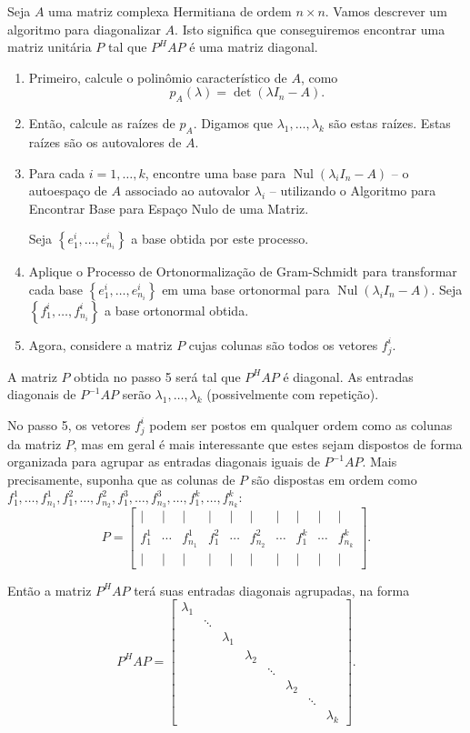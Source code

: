 Seja $A$ uma matriz complexa Hermitiana de ordem $n\times n$. Vamos descrever um algoritmo para diagonalizar $A$. Isto significa que conseguiremos encontrar uma matriz unitária $P$ tal que $P^HAP$ é uma matriz diagonal.

\begin{enumerate}
	\item Primeiro, calcule o polinômio característico de $A$, como
		\[p_A(\lambda)=\det(\lambda I_n-A).\]
	\item Então, calcule as raízes de $p_A$. Digamos que $\lambda_1,\ldots,\lambda_k$ são estas raízes. Estas raízes são os autovalores de $A$.
	\item Para cada $i=1,\ldots,k$, encontre uma base para $\operatorname{Nul}(\lambda_i I_n-A)$ -- o autoespaço de $A$ associado ao autovalor $\lambda_i$ -- utilizando o Algoritmo para Encontrar Base para Espaço Nulo de uma Matriz.
	
	Seja $\left\{e_1^i,\ldots,e_{n_i}^i\right\}$ a base obtida por este processo.
	\item Aplique o Processo de Ortonormalização de Gram-Schmidt para transformar cada base $\left\{e_1^i,\ldots,e_{n_i}^i\right\}$ em uma base ortonormal para $\operatorname{Nul}(\lambda_i I_n-A)$. Seja $\left\{f_1^i,\ldots,f_{n_i}^i\right\}$ a base ortonormal obtida.
	\item Agora, considere a matriz $P$ cujas colunas são todos os vetores $f_j^i$.
\end{enumerate}

A matriz $P$ obtida no passo 5 será tal que $P^H A P$ é diagonal. As entradas diagonais de $P^{-1}AP$ serão $\lambda_1,\ldots,\lambda_k$ (possivelmente com repetição).

No passo 5, os vetores $f_j^i$ podem ser postos em qualquer ordem como as colunas da matriz $P$, mas em geral é mais interessante que estes sejam dispostos de forma organizada para agrupar as entradas diagonais iguais de $P^{-1}AP$. Mais precisamente, suponha que as colunas de $P$ são dispostas em ordem como $f^1_1,\ldots,f^1_{n_1}, f^2_1,\ldots,f^2_{n_2},f^3_1,\ldots,f^3_{n_3},\ldots,f^k_1,\ldots,f^k_{n_k}$:
\[
P=\begin{bmatrix}
|	&|	&|	&|	&|	&|	&|	&|	&|	&|\\
f^1_1
	&\cdots
		&f^1_{n_1}
			&f^2_1
				&\cdots
					&f^2_{n_2}
						&\cdots
							&f^k_1
								&\cdots
									&f^k_{n_k}\\
|	&|	&|	&|	&|	&|	&|	&|	&|	&|
\end{bmatrix}.\]

Então a matriz $P^HAP$ terá suas entradas diagonais agrupadas, na forma
\[P^HAP=\begin{bmatrix}
\lambda_1\\
	&\ddots\\
	&	&\lambda_1\\
	&	&	&\lambda_2\\
	&	&	&	&\ddots\\
	&	&	&	&	&\lambda_2\\
	&	&	&	&	&   &\ddots\\
	&	&	&	&	&	&   &\lambda_k\end{bmatrix}.\]